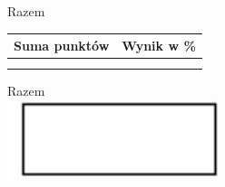 \documentclass[10pt]{article}
\begin{document}
Razem

\begin{center}
\begin{tabular}{|l|l|}
\hline
Suma punktów & Wynik w \% \\
\hline
 &  \\
 &  \\
\hline
\end{tabular}
\end{center}

Razem\\
\includegraphics[max width=\textwidth, center]{2024_11_21_b63ac6eb3d78a57ac924g-16}
\end{document}
